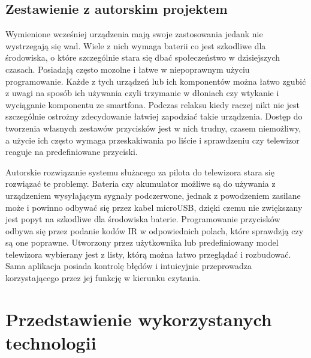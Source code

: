 \documentclass[12pt,twoside]{article}
\begin{document}
\subsection{Zestawienie z autorskim projektem}
{Wymienione wcześniej urządzenia mają swoje zastosowania jedank nie wystrzegają się wad. Wiele z nich 
 wymaga baterii co jest szkodliwe dla środowiska, o które szczególnie stara się dbać
społeczeństwo w dzisiejszych czasach. Posiadają często mozolne i łatwe w niepoprawnym użyciu programowanie. Każde z 
tych urządzeń lub ich komponentów można łatwo zgubić z uwagi na sposób ich używania czyli trzymanie w 
dłoniach czy wtykanie i wyciąganie komponentu ze smartfona. Podczas relaksu kiedy raczej nikt nie jest szczególnie 
ostrożny zdecydowanie łatwiej zapodziać takie urządzenia. Dostęp do tworzenia własnych zestawów przycisków jest w nich trudny,
 czasem niemożliwy, a użycie ich często wymaga przeskakiwania po liście i sprawdzeniu czy telewizor reaguje na predefiniowane przyciski.

Autorskie rozwiązanie systemu służacego za pilota do telewizora stara się rozwiązać te problemy. Bateria czy akumulator możliwe 
są do używania z urządzeniem wysyłającym sygnały podczerwone, jednak z powodzeniem zasilane może i powinno odbywać się przez 
kabel microUSB, dzięki czemu nie zwiększany jest popyt na szkodliwe dla środowiska baterie. Programowanie przycisków
odbywa się przez podanie kodów IR w odpowiednich polach, które sprawdzją czy są one poprawne. Utworzony przez użytkownika lub predefiniowany
 model telewizora wybierany jest z listy, którą można łatwo przeglądać i rozbudować. Sama aplikacja posiada kontrolę błędów
 i intuicyjnie przeprowadza korzystającego przez jej funkcję w kierunku czytania.
}
\clearpage
\section{Przedstawienie wykorzystanych technologii}
\end{document}
